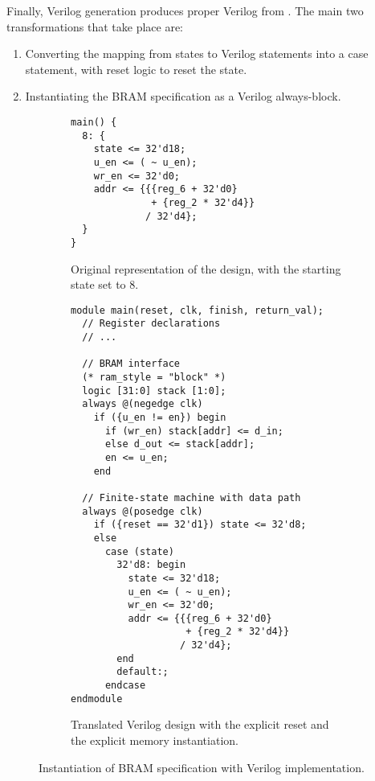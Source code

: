 Finally, Verilog generation produces proper Verilog from \htl{}.  The main two
transformations that take place are:

\begin{enumerate}
\item Converting the mapping from states to Verilog statements into a case
  statement, with reset logic to reset the state.
\item Instantiating the \gls{BRAM} specification as a Verilog always-block.
\end{enumerate}

\begin{figure}
  \centering
  \begin{subfigure}{0.45\linewidth}
\begin{verbatim}
main() {
  8: {
    state <= 32'd18;
    u_en <= ( ~ u_en);
    wr_en <= 32'd0;
    addr <= {{{reg_6 + 32'd0}
              + {reg_2 * 32'd4}}
             / 32'd4};
  }
}
\end{verbatim}
    \caption{Original \htl{} representation of the design, with the starting
      state set to 8.}%
    \label{fig:hg:ram-instantiation:htl}
  \end{subfigure}\hfill%
  \begin{subfigure}{0.5\linewidth}
\begin{verbatim}
module main(reset, clk, finish, return_val);
  // Register declarations
  // ...

  // BRAM interface
  (* ram_style = "block" *)
  logic [31:0] stack [1:0];
  always @(negedge clk)
    if ({u_en != en}) begin
      if (wr_en) stack[addr] <= d_in;
      else d_out <= stack[addr];
      en <= u_en;
    end

  // Finite-state machine with data path
  always @(posedge clk)
    if ({reset == 32'd1}) state <= 32'd8;
    else
      case (state)
        32'd8: begin
          state <= 32'd18;
          u_en <= ( ~ u_en);
          wr_en <= 32'd0;
          addr <= {{{reg_6 + 32'd0}
                    + {reg_2 * 32'd4}}
                   / 32'd4};
        end
        default:;
      endcase
endmodule
\end{verbatim}
    \caption{Translated Verilog design with the explicit reset and the explicit
      memory instantiation.}%
    \label{fig:hg:ram-instantiation:verilog}
  \end{subfigure}
  \caption[Instantiation of BRAM specification with Verilog
  implementation.]{Instantiation of \gls{BRAM} specification with Verilog
    implementation.}%
  \label{fig:hg:ram-instantiation}
\end{figure}

